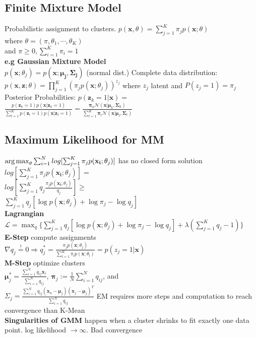 \subsection*{Finite Mixture Model}
Probabilistic assignment to clusters.
$p(\mathbf{x},\theta)=\sum_{j=1}^K\pi_j p(\mathbf{x};\theta)$\\ where $\theta=(\pi, \theta_1, \dotsi, \theta_K)$\\
and $\pi\geq0, \sum_{i=1}^K\pi_i=1$\\
\textbf{e.g Gaussian Mixture Model}\\
$p(\mathbf{x};\theta_j) = p(\mathbf{x};\mathbf{\mu_j},\mathbf{\Sigma_j})$ (normal dist.)
Complete data distribution:\\
$p(\mathbf{x},\mathbf{z};\theta)=\prod_{j=1}^K(\pi_j p(\mathbf{x};\theta_j))^{z_j}$ where $z_j$ latent and $P(z_j=1)=\pi_j$\\
Posterior Probabilities: 
 $p(\mathbf{z}_k{=}1|\mathbf{x}) = $\\$\frac{p(\mathbf{z}_k=1) p(\mathbf{x}|\mathbf{z}_k=1)}{\sum_{l=1}^K p(\mathbf{z}_l = 1) p(\mathbf{x} | \mathbf{z}_l = 1)} = \frac{\boldsymbol{\pi}_k \mathcal{N}(\mathbf{x} | \boldsymbol{\mu}_k, \boldsymbol{\Sigma}_k)}{\sum_{l=1}^K \boldsymbol{\pi}_l \mathcal{N}(\mathbf{x} | \boldsymbol{\mu}_l, \boldsymbol{\Sigma}_l)}$

\subsection*{Maximum Likelihood for MM}
$\operatorname*{arg\,max}_\theta\sum_{i=1}^N log[\sum_{j=1}^K\pi_j p(\mathbf{x_i};\theta_j)]$ has no closed form solution\\
$log[\sum_{j=1}^K\pi_j p(\mathbf{x_i};\theta_j)]=$\\
$log[\sum_{j=1}^K q_j \frac{\pi_j p(\mathbf{x_i};\theta_j)}{q_j}]\geq$\\
$\sum_{j=1}^K q_j[\log p(\mathbf{x};\theta_j)+\log \pi_j-\log q_j]$\\
\textbf{Lagrangian}\\
$\mathcal{L}{=}\max_q\{\sum_{j=1}^Kq_j[\log p(\mathbf{x};\theta_j){+}\log \pi_j-\log q_j]{+}\lambda (\sum_{j=1}^Kq_j-1)\}$\\
\textbf{E-Step} compute assignments\\
$\nabla q_j{\stackrel{!}{=}}0\Rightarrow
q_j^*{=}\frac{\pi_jp(\mathbf{x};\theta_j)}{\sum_{l=1}^K\pi_l p(\mathbf{x};\theta_l)}{=}p(z_j{=}1|\mathbf{x})$\\
\textbf{M-Step} optimize clusters\\
$\mathbf{\mu}_j^*=\frac{\sum_{i=1}^N q_{i j} \mathbf{x}_i}{\sum_{i=1}^N q_{i j}}$,
$\mathbf{\pi}_j := \frac{1}{N} \sum_{i=1}^N q_{i j}$, and\\ $\Sigma_j = \frac{\sum_{i=1}^N q_{i j} (\mathbf{x}_n - \mathbf{\mu}_j)(\mathbf{x}_j - \mathbf{\mu}_j)^T}{\sum_{i=1}^N q_{i j}}$
EM requires more steps and computation to reach convergence than K-Mean\\
\textbf{Singularities of GMM} happen when a cluster shrinks to fit exactly one data point. log likelihood $\rightarrow \infty$. Bad convergence